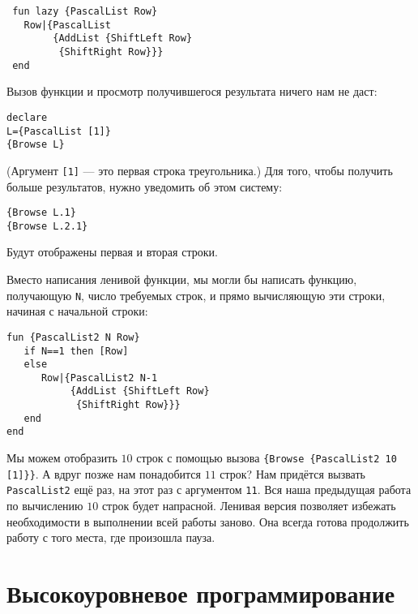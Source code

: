 \begin{lstlisting}
 fun lazy {PascalList Row}
   Row|{PascalList
        {AddList {ShiftLeft Row}
         {ShiftRight Row}}}
 end
\end{lstlisting}



Вызов функции и просмотр получившегося результата ничего нам не даст:

\begin{lstlisting}
declare
L={PascalList [1]}
{Browse L}
\end{lstlisting}

(Аргумент \lstinline|[1]| --- это первая строка треугольника.) Для того, чтобы получить больше результатов, нужно уведомить об этом систему:

\begin{lstlisting}
{Browse L.1}
{Browse L.2.1}
\end{lstlisting}

Будут отображены первая и вторая строки.

Вместо написания ленивой функции, мы могли бы написать функцию, получающую \lstinline|N|, число требуемых строк, и прямо вычисляющую эти строки, начиная с начальной строки:



\begin{lstlisting}
fun {PascalList2 N Row}
   if N==1 then [Row]
   else
      Row|{PascalList2 N-1
           {AddList {ShiftLeft Row}
            {ShiftRight Row}}}
   end
end
\end{lstlisting}


Мы можем отобразить $10$ строк с помощью вызова \lstinline|{Browse {PascalList2 10 [1]}}|. А вдруг позже нам понадобится $11$ строк? Нам придётся вызвать \lstinline|PascalList2| ещё раз, на этот раз с аргументом \lstinline|11|. Вся наша предыдущая работа по вычислению $10$ строк будет напрасной. Ленивая версия позволяет избежать необходимости в выполнении всей работы заново. Она всегда готова продолжить работу с того места, где произошла пауза.

\section{Высокоуровневое программирование}\label{section:higher-order_programming}

